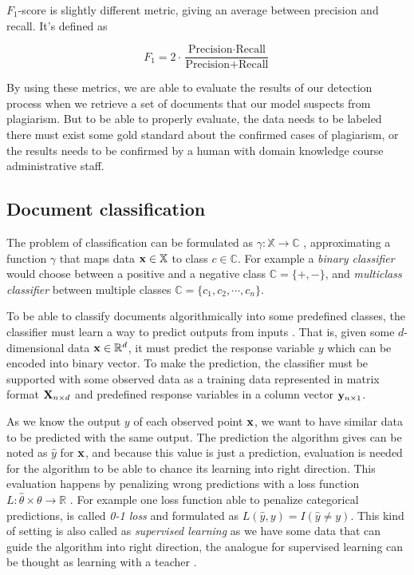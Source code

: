 $F_1$-score is slightly different metric, giving an average between precision and recall. It's defined as

\begin{equation}
    F_1 = 2 \cdot \dfrac{\text{Precision} \cdot \text{Recall}}{\text{Precision} + \text{Recall}}
\end{equation}

By using these metrics, we are able to evaluate the results of our detection process when we retrieve a set of documents that our model suspects from plagiarism. But to be able to properly evaluate, the data needs to be labeled \ie there must exist some gold standard about the confirmed cases of plagiarism, or the results needs to be confirmed by a human with domain knowledge \eg course administrative staff. 

\subsection{Document classification}

The problem of classification can be formulated as $\gamma: \mathbb{X} \rightarrow \mathbb{C}$ \cite{Manning:2008:IIR:1394399}, approximating a function $\gamma$ that maps data $\mathbf{x} \in \mathbb{X}$ to class $c \in \mathbb{C}$. For example a \emph{binary classifier} would choose between a positive and a negative class $\mathbb{C} = \{+, -\}$, and \emph{multiclass classifier} between multiple classes $\mathbb{C} = \{c_1, c_2, \cdots, c_n\}$.

To be able to classify documents algorithmically into some predefined classes, the classifier must learn a way to predict outputs from inputs \cite{hastie_09_elements-of.statistical-learning}. That is, given some $d$-dimensional data $\mathbf{x} \in \mathbb{R}^d$, it must predict the response variable $y$ which can be encoded into binary vector. To make the prediction, the classifier must be supported with some observed data as a training data represented in matrix format $\mathbf{X}_{n \times d}$ and predefined response variables in a column vector $\mathbf{y}_{n \times 1}$. 

As we know the output $y$ of each observed point $\mathbf{x}$, we want to have similar data to be predicted with the same output. The prediction the algorithm gives can be noted as $\hat{y}$ for $\mathbf{x}$, and because this value is just a prediction, evaluation is needed for the algorithm to be able to chance its learning into right direction. This evaluation happens by penalizing wrong predictions with a loss function $L: \hat{\theta} \times \theta \rightarrow \mathbb{R}$ \cite{hastie_09_elements-of.statistical-learning}. For example one loss function able to penalize categorical predictions, is called \emph{0-1 loss} and formulated as $L(\hat{y}, y) = I(\hat{y} \neq y)$. This kind of setting is also called as \emph{supervised learning} as we have some data that can guide the algorithm into right direction, the analogue for supervised learning can be thought as learning with a teacher \cite{hastie_09_elements-of.statistical-learning}.


